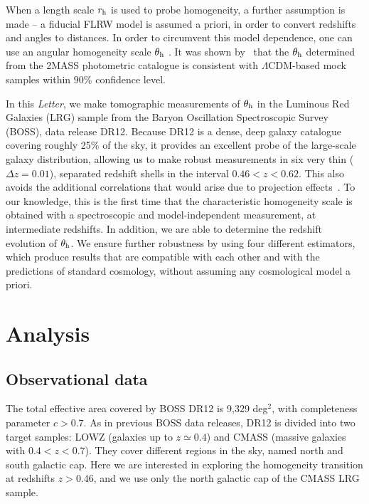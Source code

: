 \documentclass[useAMS,usenatbib]{mn2e}
\begin{document}
When a length scale $r_{\rm h}$ is used to probe homogeneity, a further assumption is made -- a fiducial FLRW model is assumed a priori, in order to convert redshifts and angles to distances. In order to circumvent this model dependence, one can use an angular homogeneity scale $\theta_{\rm h}$ \citep{alonso14}. It was shown by~\cite{alonso15} that the $\theta_{\rm h}$ determined from the 2MASS photometric catalogue is consistent with $\Lambda$CDM-based mock samples within $90\%$ confidence level.

In this {\it Letter}, we make tomographic measurements of $\theta_{\rm h}$ in the Luminous Red Galaxies (LRG) sample from the Baryon Oscillation Spectroscopic Survey (BOSS), data release DR12. Because DR12 is a dense, deep galaxy catalogue covering roughly 25\% of the sky, it provides an excellent probe of the large-scale galaxy distribution, allowing us to make robust measurements in six very thin ($\Delta z = 0.01$), separated redshift shells in the interval $0.46 < z < 0.62$. This also avoids the additional correlations that would arise due to projection effects~\citep{sarkar16,carvalho16,carvalho17}. To our knowledge, this is the first time that the characteristic homogeneity scale is obtained with a spectroscopic and model-independent measurement, at intermediate redshifts. In addition, we are able to determine the redshift evolution of $\theta_{\rm h}$. We ensure further robustness by using four different estimators, which produce results that are compatible with each other and with the 
predictions of 
standard 
cosmology, without assuming any cosmological model a priori.


\section{Analysis}

\subsection{Observational data}

The total effective area covered by BOSS DR12 is 9,329 deg$^2$, with completeness parameter $c > 0.7$. As in previous BOSS data releases, DR12 is divided into two target samples: LOWZ (galaxies up to $z \simeq 0.4$) and CMASS (massive galaxies with $0.4 < z < 0.7$). They cover different regions in the sky, named north and south galactic cap. Here we are interested in exploring the homogeneity transition at redshifts $z > 0.46$, and we use only the north galactic cap of the CMASS LRG sample. 
\end{document}
